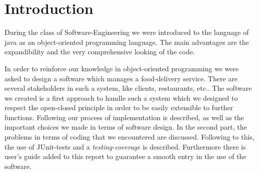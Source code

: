 \section{Introduction}
During the class of Software-Engineering we were introduced to the language of java as an object-oriented 
programming language. The main advantages are the expandibility and the very comprehensive looking of 
the code.

In order to reinforce our knowledge in object-oriented programming we were asked to design a software
which manages a food-delivery service. There are several stakeholders in such a system, like clients, 
restaurants, etc.. The software we created is a first approach to handle such a system which we
designed to respect the open-closed principle in order to be easily extensible to further functions.
Following our process of implementation is described, as well as the important choices we made in 
terms of software design. In the second part, the problems in terms of coding that we encountered are 
discussed. Following to this, the use of JUnit-tests and a \textit{testing-coverage} is described.
Furthermore there is user's guide added to this report to guarantee a smooth entry in the use of the
software.
